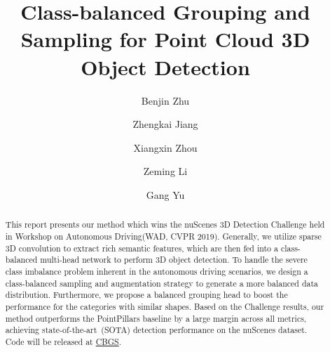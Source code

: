 \documentclass[10pt,twocolumn,letterpaper]{article}
\begin{document}
\title{Class-balanced Grouping and Sampling for Point Cloud 3D Object Detection} 

\author[1]{Benjin Zhu }
\author[1,2]{Zhengkai Jiang }
\author[3]{Xiangxin Zhou }
\author[1]{Zeming Li } 
\author[1]{Gang Yu } 



\maketitle


\begin{abstract}
    This report presents our method which wins the nuScenes 3D Detection Challenge \cite{nusc3ddet} held in Workshop on Autonomous Driving(WAD, CVPR 2019). Generally, we utilize sparse 3D convolution to extract rich semantic features, which are then fed into a class-balanced multi-head network to perform 3D object detection. To handle the severe class imbalance problem inherent in the autonomous driving scenarios, we design a class-balanced sampling and augmentation strategy to generate a more balanced data distribution. Furthermore, we propose a balanced grouping head to boost the performance for the categories with similar shapes.  Based on the Challenge results, our method outperforms the PointPillars  \cite{pointpillars} baseline by a large margin across all metrics, achieving state-of-the-art~(SOTA) detection performance on the nuScenes dataset. Code will be released at \href{https://github.com/poodarchu/Class-balanced-Grouping-and-Sampling-for-Point-Cloud-3D-Object-Detection}{CBGS}.
\end{abstract}
\end{document}
